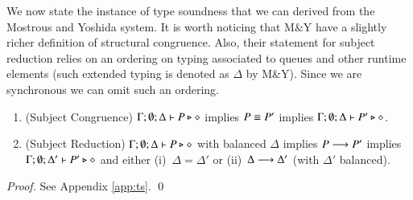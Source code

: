 We now state the instance of type soundness that we can derived from the Mostrous and Yoshida system.
It is worth noticing that M\&Y have a slightly richer definition of structural congruence.
Also, their statement for subject reduction relies on an ordering on typing associated to queues and other 
runtime elements (such extended typing is denoted as $\Delta$ by M\&Y).
Since we are synchronous we can omit such an ordering.

\begin{theorem}\label{t:sr}\rm
%
	\begin{enumerate}[1.]
		\item	(Subject Congruence)
			$\Gamma; \emptyset; \Delta \vdash P \triangleright \diamond$
			implies
			$P \equiv P'$ implies $\Gamma; \emptyset; \Delta \vdash P' \triangleright \diamond$.

		\item	(Subject Reduction)
			$\Gamma; \emptyset; \Delta \vdash P \triangleright \diamond$
			with
			balanced $\Delta$
			implies
			$P \longrightarrow P'$ implies $\Gamma; \emptyset; \Delta'  \vdash P' \triangleright \diamond$
			and either (i)~$\Delta = \Delta'$ or (ii)~$\Delta \longrightarrow \Delta'$
			(with $\Delta'$ balanced).
	\end{enumerate}
\end{theorem}

\begin{proof}
	See Appendix \ref{app:ts}.
	\qed
\end{proof}
